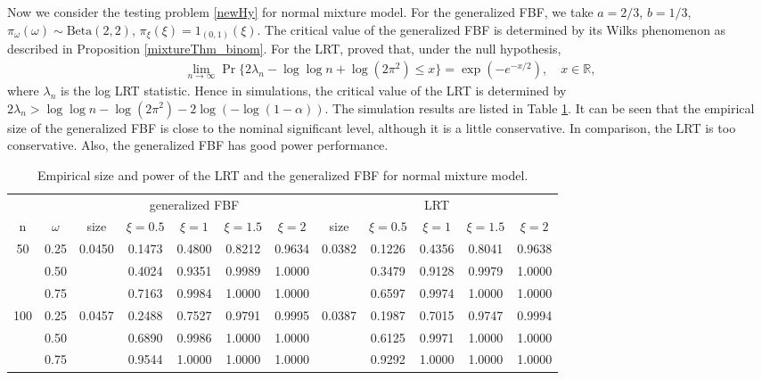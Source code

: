 \documentclass[11pt]{article}
\theoremstyle{plain}
\theoremstyle{definition}
\theoremstyle{remark}
\begin{document}

Now we consider the testing problem \eqref{newHy} for normal mixture model.
For the generalized FBF, we take $a = 2/3$, $b = 1/3$,  $\pi_\omega(\omega)\sim \text{Beta}(2, 2)$, $\pi_\xi(\xi) = 1_{(0,1)}(\xi)$.
The critical value of the generalized FBF is determined by its Wilks phenomenon as described in Proposition \ref{mixtureThm_binom}.
For the LRT, \cite{LIU200461} proved that, under the null hypothesis,
\begin{align*}
    \lim_{n\to \infty}  \Pr \{ 2\lambda_n - \log \log n + \log(2\pi^2) \leq x \} =  \exp(-e^{-x/2}), \quad x \in \mathbb R,
\end{align*}
where $\lambda_n$ is the log LRT statistic.
Hence in simulations, the critical value of the LRT is determined by $2\lambda_n > \log \log n - \log (2\pi^2) - 2\log(-\log(1-\alpha))$.
The simulation results are listed in Table \ref{normal_table1}.
It can be seen that the empirical size of the generalized FBF is close to the nominal significant level, although it is a little conservative.
In comparison, the LRT is too conservative.
Also, the generalized FBF has good power performance.
\begin{table}[ht]
    \caption{Empirical size and power of the LRT and the generalized FBF for normal mixture model.}
    \label{normal_table1}
    \small
    \centering
    \begin{tabular}{cccccccccccc}
        \toprule
         & & \multicolumn{5}{c}{generalized FBF} &\multicolumn{5}{c}{LRT}\\
        \cmidrule(r){3-7}\cmidrule(r){8-12}
        n & $\omega$ 
        & size & $\xi= 0.5$& $\xi= 1$ & $\xi= 1.5$ & $\xi= 2$
        & size & $\xi= 0.5$& $\xi= 1$ & $\xi= 1.5$ & $\xi= 2$
        \\ 
        \midrule
        50 &0.25& 0.0450& 0.1473& 0.4800& 0.8212 &0.9634& 0.0382  & 0.1226& 0.4356 & 0.8041 & 0.9638 \\
        &0.50   &       & 0.4024& 0.9351& 0.9989 &1.0000&         &0.3479 & 0.9128 & 0.9979 & 1.0000 \\
        &0.75 &         &0.7163 & 0.9984& 1.0000 &1.0000&         &0.6597 & 0.9974 & 1.0000 & 1.0000 \\
        \midrule
        100 &0.25 &0.0457& 0.2488& 0.7527& 0.9791 &0.9995& 0.0387 & 0.1987& 0.7015 & 0.9747 & 0.9994\\
        &0.50   &       & 0.6890& 0.9986& 1.0000 &1.0000&       & 0.6125 & 0.9971 & 1.0000 & 1.0000\\
        &0.75   &       & 0.9544& 1.0000& 1.0000 &1.0000&       & 0.9292& 1.0000& 1.0000 & 1.0000\\
        \bottomrule

    \end{tabular}

\end{table}
\end{document}
